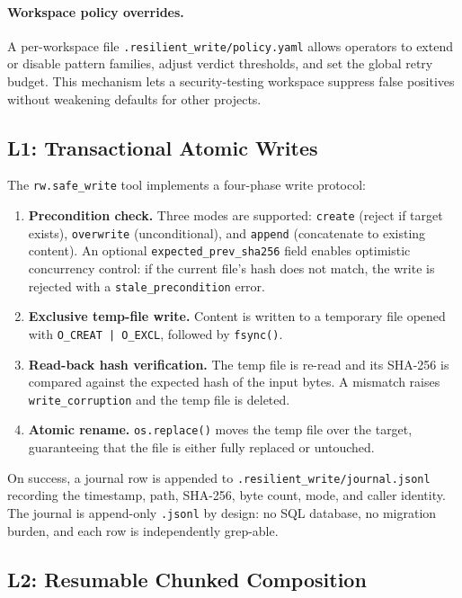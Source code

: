 \documentclass[11pt,twocolumn]{article}
\newcommand{\tool}[1]{\texttt{#1}}
\begin{document}
\paragraph{Workspace policy overrides.}
A per-workspace file \texttt{.resilient\_write/policy.yaml} allows
operators to extend or disable pattern families, adjust verdict
thresholds, and set the global retry budget.  This mechanism lets a
security-testing workspace suppress false positives without weakening
defaults for other projects.

\subsection{L1: Transactional Atomic Writes}
\label{sec:l1}

The \tool{rw.safe\_write} tool implements a four-phase write protocol:

\begin{enumerate}[nosep]
  \item \textbf{Precondition check.}  Three modes are supported:
    \texttt{create} (reject if target exists),
    \texttt{overwrite} (unconditional), and
    \texttt{append} (concatenate to existing content).
    An optional \texttt{expected\_prev\_sha256} field enables
    optimistic concurrency control: if the current file's hash does
    not match, the write is rejected with a
    \texttt{stale\_precondition} error.
  \item \textbf{Exclusive temp-file write.}  Content is written to a
    temporary file opened with \texttt{O\_CREAT\,|\,O\_EXCL},
    followed by \texttt{fsync()}.
  \item \textbf{Read-back hash verification.}  The temp file is
    re-read and its SHA-256 is compared against the expected hash
    of the input bytes.  A mismatch raises
    \texttt{write\_corruption} and the temp file is deleted.
  \item \textbf{Atomic rename.}  \texttt{os.replace()} moves the
    temp file over the target, guaranteeing that the file is either
    fully replaced or untouched.
\end{enumerate}

On success, a journal row is appended to
\texttt{.resilient\_write/journal.jsonl} recording the timestamp,
path, SHA-256, byte count, mode, and caller identity.  The journal is
append-only \texttt{.jsonl} by design: no SQL database, no migration
burden, and each row is independently grep-able.

\subsection{L2: Resumable Chunked Composition}
\label{sec:l2}
\end{document}

